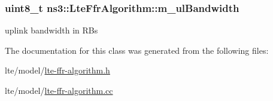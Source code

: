 \subsubsection[{\texorpdfstring{m\+\_\+ul\+Bandwidth}{m_ulBandwidth}}]{\setlength{\rightskip}{0pt plus 5cm}uint8\+\_\+t ns3\+::\+Lte\+Ffr\+Algorithm\+::m\+\_\+ul\+Bandwidth\hspace{0.3cm}{\ttfamily [protected]}}\hypertarget{classns3_1_1LteFfrAlgorithm_acfa0105633ee5c27538c3309eb132d21}{}\label{classns3_1_1LteFfrAlgorithm_acfa0105633ee5c27538c3309eb132d21}
uplink bandwidth in R\+Bs 

The documentation for this class was generated from the following files\+:\begin{DoxyCompactItemize}
\item 
lte/model/\hyperlink{lte-ffr-algorithm_8h}{lte-\/ffr-\/algorithm.\+h}\item 
lte/model/\hyperlink{lte-ffr-algorithm_8cc}{lte-\/ffr-\/algorithm.\+cc}\end{DoxyCompactItemize}
